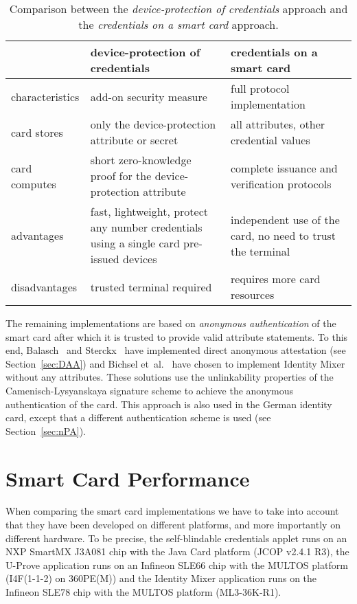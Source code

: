 \begin{table}
  \centering
  \caption{Comparison between the \emph{device-protection of credentials}
    approach and the \emph{credentials on a smart card} approach.}
  \label{tbl:approaches}
  \renewcommand{\tabcolsep}{1.25mm}
  \renewcommand{\arraystretch}{1.25}
  \begin{tabular}{l|p{47mm}|p{47mm}|}
     & device-protection of credentials & credentials on a smart card \\\hline
    characteristics &
      add-on security measure &
      full protocol implementation \\\hline
    card stores &
      only the device-protection attribute or secret &
      all attributes, other credential values \\\hline
    card computes &
      short zero-knowledge proof for the device-protection attribute &
      complete issuance and verification protocols \\\hline
    advantages &
      fast, lightweight, protect any number credentials
        using a single card pre-issued devices &
      independent use of the card, no need to trust the terminal \\\hline
    disadvantages &
      trusted terminal required &
      requires more card resources \\\hline
  \end{tabular}
\end{table}

The remaining implementations are based on \emph{anonymous authentication} of
the smart card after which it is trusted to provide valid attribute statements.
To this end, Balasch~\cite{Balasch2008} and Sterckx~\cite{Sterckx09} have
implemented direct anonymous attestation (see Section~\ref{sec:DAA}) and
Bichsel et~al.~\cite{BichselCGS2009} have chosen to implement Identity Mixer
without any attributes. These solutions use the unlinkability properties of the
Camenisch-Lysyanskaya signature scheme to achieve the anonymous authentication
of the card. This approach is also used in the German identity card, except that
a different authentication scheme is used (see Section~\ref{sec:nPA}).

\section{Smart Card Performance\label{sec:perf-comparison}}

When comparing the smart card implementations we have to take into account that
they have been developed on different platforms, and more importantly on
different hardware. To be precise, the self-blindable credentials applet runs on
an NXP SmartMX J3A081 chip with the Java Card platform (JCOP v2.4.1 R3), the
U-Prove application runs on an Infineon SLE66 chip with the MULTOS platform
(I4F(1-1-2) on 360PE(M)) and the Identity Mixer application runs on the Infineon
SLE78 chip with the MULTOS platform (ML3-36K-R1).

